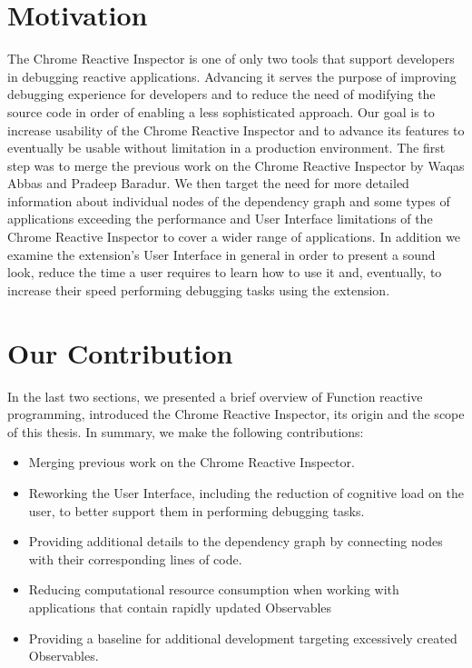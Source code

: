 \section{Motivation}
The Chrome Reactive Inspector is one of only two tools that support developers in debugging reactive applications. Advancing it serves the purpose of improving debugging experience for developers and to reduce the need of modifying the source code in order of enabling a less sophisticated approach. Our goal is to increase usability of the Chrome Reactive Inspector and to advance its features to eventually be usable without limitation in a production environment. The first step was to merge the previous work on the Chrome Reactive Inspector by Waqas Abbas and Pradeep Baradur. We then target the need for more detailed information about individual nodes of the dependency graph and some types of applications exceeding the performance and User Interface limitations of the Chrome Reactive Inspector to cover a wider range of applications. In addition we examine the extension's User Interface in general in order to present a sound look, reduce the time a user requires to learn how to use it and, eventually, to increase their speed performing debugging tasks using the extension.


\section{Our Contribution}

In the last two sections, we presented a brief overview of Function reactive programming, introduced the Chrome Reactive Inspector, its origin and the scope of this thesis.
In summary, we make the following contributions:

\begin{itemize}
	\item Merging previous work on the Chrome Reactive Inspector.
	\item Reworking the User Interface, including the reduction of cognitive load on the user, to better support them in performing debugging tasks.
	\item Providing additional details to the dependency graph by connecting nodes with their corresponding lines of code.
	\item Reducing computational resource consumption when working with applications that contain rapidly updated Observables
	\item Providing a baseline for additional development targeting excessively created Observables.
\end{itemize}

